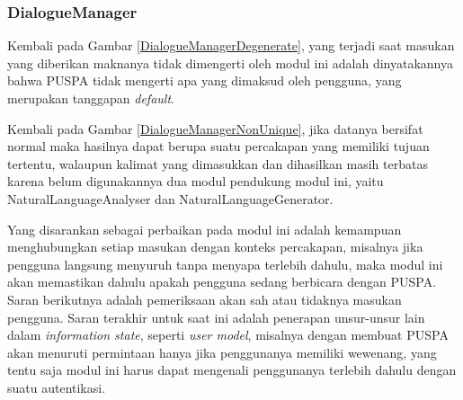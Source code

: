 \subsubsection*{DialogueManager}

Kembali pada Gambar \ref{DialogueManagerDegenerate},
yang terjadi saat masukan yang diberikan maknanya tidak dimengerti oleh modul ini adalah dinyatakannya bahwa PUSPA tidak mengerti apa yang dimaksud oleh pengguna,
yang merupakan tanggapan \textit{default}.

Kembali pada Gambar \ref{DialogueManagerNonUnique},
jika datanya bersifat normal maka hasilnya dapat berupa suatu percakapan yang memiliki tujuan tertentu,
walaupun kalimat yang dimasukkan dan dihasilkan masih terbatas karena belum digunakannya dua modul pendukung modul ini,
yaitu NaturalLanguageAnalyser dan NaturalLanguageGenerator.

Yang disarankan sebagai perbaikan pada modul ini adalah kemampuan menghubungkan setiap masukan dengan konteks percakapan,
misalnya jika pengguna langsung menyuruh tanpa menyapa terlebih dahulu,
maka modul ini akan memastikan dahulu apakah pengguna sedang berbicara dengan PUSPA.
Saran berikutnya adalah pemeriksaan akan sah atau tidaknya masukan pengguna.
Saran terakhir untuk saat ini adalah penerapan unsur-unsur lain dalam \textit{information state},
seperti \textit{user model},
misalnya dengan membuat PUSPA akan menuruti permintaan hanya jika penggunanya memiliki wewenang,
yang tentu saja modul ini harus dapat mengenali penggunanya terlebih dahulu dengan suatu autentikasi.
